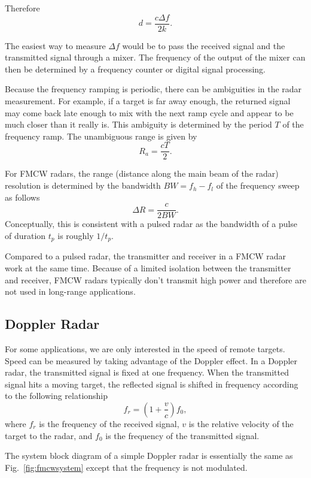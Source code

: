 \documentclass[letterpaper, 11pt]{article}
\newcommand{\due}[1]{\href{https://github.com/ucdart/UCD-EEC134/blob/master/support/schedule/eec134-schedule.pdf}{\textcolor{red}{#1}}}
\begin{document}
Therefore
\[
d = \frac{c\Delta f}{2k}.
\]

The easiest way to measure $\Delta f$ would be to pass the received signal and the transmitted signal through a mixer. The frequency of the output of the mixer can then be determined by a frequency counter or digital signal processing. 

Because the frequency ramping is periodic, there can be ambiguities in the radar measurement. For example, if a target is far away enough, the returned signal may come back late enough to mix with the next ramp cycle and appear to be much closer than it really is. This ambiguity is determined by the period $T$ of the frequency ramp. The unambiguous range is given by 
\[
R_a = \frac{cT}{2}. 
\]

For FMCW radars, the range (distance along the main beam of the radar) resolution is determined by the bandwidth $BW = f_h - f_l$ of the frequency sweep as follows
\[
\Delta R = \frac{c}{2BW}. 
\]
Conceptually, this is consistent with a pulsed radar as the bandwidth of a pulse of duration $t_p$ is roughly $1/t_p$. 

Compared to a pulsed radar, the transmitter and receiver in a FMCW radar work at the same time. Because of a limited isolation between the transmitter and receiver, FMCW radars typically don't transmit high power and therefore are not used in long-range applications.

\subsection{Doppler Radar}

For some applications, we are only interested in the speed of remote targets. Speed can be measured by taking advantage of the Doppler effect. In a Doppler radar, the transmitted signal is fixed at one frequency. When the transmitted signal hits a moving target, the reflected signal is shifted in frequency according to the following relationship 
\[
f_r = \left( 1+\frac{v}{c} \right) f_0,
\] 
where $f_r$ is the frequency of the received signal, $v$ is the relative velocity of the target to the radar, and $f_0$ is the frequency of the transmitted signal. 

The system block diagram of a simple Doppler radar is essentially the same as Fig.~\ref{fig:fmcwsystem} except that the frequency is not modulated. 

\vspace{3ex}

%
%
\end{document}
